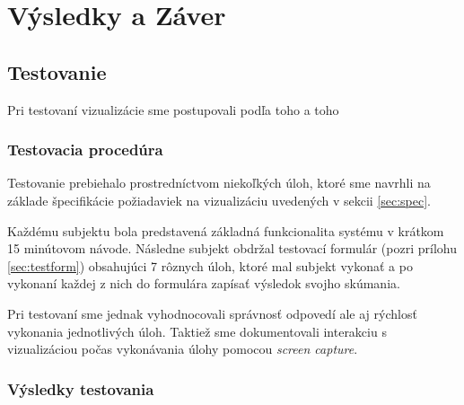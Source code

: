 \chapter{Výsledky a Záver}

\section{Testovanie}
Pri testovaní vizualizácie sme postupovali podľa toho a toho %

\subsection{Testovacia procedúra}
Testovanie prebiehalo prostredníctvom niekoľkých úloh, ktoré sme navrhli na základe špecifikácie požiadaviek na vizualizáciu uvedených v sekcii \ref{sec:spec}. 

Každému subjektu bola predstavená základná funkcionalita systému v krátkom 15 minútovom návode. Následne subjekt obdržal testovací formulár (pozri prílohu \ref{sec:testform}) obsahujúci 7 rôznych úloh, ktoré mal subjekt vykonať a po vykonaní každej z nich do formulára zapísať výsledok svojho skúmania.

Pri testovaní sme jednak vyhodnocovali správnosť odpovedí ale aj rýchlosť vykonania jednotlivých úloh. Taktiež sme dokumentovali interakciu s vizualizáciou počas vykonávania úlohy pomocou \textit{screen capture}.

\subsection{Výsledky testovania}

